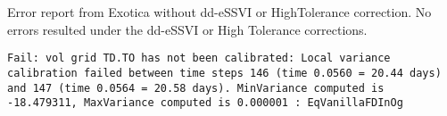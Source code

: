 \documentclass[11pt,letterpaper]{article}
\begin{document}
\newpage



\begin{center}
Error report from Exotica without dd-eSSVI or HighTolerance correction. No errors resulted under the dd-eSSVI or High Tolerance corrections.

\texttt{Fail: vol grid TD.TO has not been calibrated: Local variance calibration failed between time steps 146 (time 0.0560 = 20.44 days) and 147 (time 0.0564 = 20.58 days). MinVariance computed is -18.479311, MaxVariance computed is 0.000001 : EqVanillaFDInOg}
\end{center}
\end{document}
